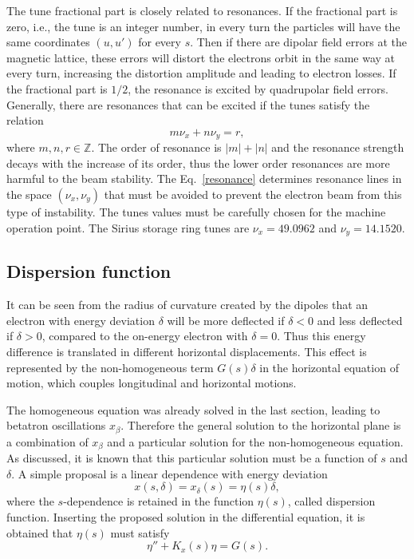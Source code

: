 The tune fractional part is closely related to resonances. If the fractional part is zero, i.e., the tune is an integer number, in every turn the particles will have the same coordinates $(u, u')$ for every $s$. Then if there are dipolar field errors at the magnetic lattice, these errors will distort the electrons orbit in the same way at every turn, increasing the distortion amplitude and leading to electron losses. If the fractional part is $1/2$, the resonance is excited by quadrupolar field errors. Generally, there are resonances that can be excited if the tunes satisfy the relation
\begin{equation}
    m \nu_x + n \nu_y = r,
    \label{resonance}
\end{equation}
where $m, n, r \in \mathbb{Z}$. The order of resonance is $|m| + |n|$ and the resonance strength decays with the increase of its order, thus the lower order resonances are more harmful to the beam stability. The Eq.~\eqref{resonance} determines resonance lines in the space $(\nu_x, \nu_y)$ that must be avoided to prevent the electron beam from this type of instability. The tunes values must be carefully chosen for the machine operation point. The Sirius storage ring tunes are $\nu_x = 49.0962$ and $\nu_y=14.1520$.
\subsection{Dispersion function}
It can be seen from the radius of curvature created by the dipoles that an electron with energy deviation $\delta$ will be more deflected if $\delta < 0$ and less deflected if $\delta > 0$, compared to the on-energy electron with $\delta = 0$. Thus this energy difference is translated in different horizontal displacements. This effect is represented by the non-homogeneous term $G(s)\delta$ in the horizontal equation of motion, which couples longitudinal and horizontal motions.

The homogeneous equation was already solved in the last section, leading to betatron oscillations $x_{\beta}$. Therefore the general solution to the horizontal plane is a combination of $x_{\beta}$ and a particular solution for the non-homogeneous equation. As discussed, it is known that this particular solution must be a function of $s$ and $\delta$. A simple proposal is a linear dependence with energy deviation
\begin{equation}
    x(s, \delta) = x_{\delta}(s) = \eta(s) \delta,
\end{equation}
where the $s$-dependence is retained in the function $\eta(s)$, called dispersion function. Inserting the proposed solution in the differential equation, it is obtained that $\eta(s)$ must satisfy
\begin{equation}
    \eta'' + K_x(s)\eta = G(s).
    \label{eq:dispersion}
\end{equation}

